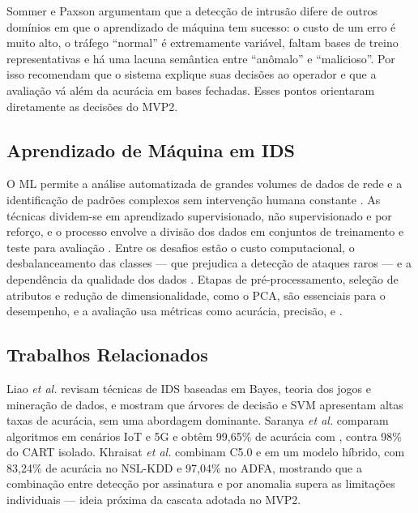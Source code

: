 Sommer e Paxson \cite{Sommer2010Outside} argumentam que a detecção de intrusão
difere de outros domínios em que o aprendizado de máquina tem sucesso: o custo de
um erro é muito alto, o tráfego “normal” é extremamente variável, faltam bases de
treino representativas e há uma lacuna semântica entre “anômalo” e “malicioso”.
Por isso recomendam que o sistema explique suas decisões ao operador e que a
avaliação vá além da acurácia em bases fechadas. Esses pontos orientaram
diretamente as decisões do MVP2.

\subsection{Aprendizado de Máquina em IDS}
O ML permite a análise automatizada de grandes volumes de dados de rede e a
identificação de padrões complexos sem intervenção humana constante
\cite{zehedi2023comparative, Thakkar2021Survey}. As técnicas dividem-se em
aprendizado supervisionado, não supervisionado e por reforço, e o processo envolve
a divisão dos dados em conjuntos de treinamento e teste para avaliação
\cite{zehedi2023comparative, emad2022intrusion}. Entre os desafios estão o custo
computacional, o desbalanceamento das classes --- que prejudica a detecção de
ataques raros --- e a dependência da qualidade dos dados \cite{zehedi2023comparative}.
Etapas de pré-processamento, seleção de atributos e redução de dimensionalidade,
como o PCA, são essenciais para o desempenho, e a avaliação usa métricas como
acurácia, precisão,  e  \cite{zehedi2023comparative, Thakkar2021Survey}.

\subsection{Trabalhos Relacionados}
Liao \textit{et al.} \cite{Liao2013Intrusion} revisam técnicas de IDS baseadas em
Bayes, teoria dos jogos e mineração de dados, e mostram que árvores de decisão e SVM
apresentam altas taxas de acurácia, sem uma abordagem dominante. Saranya
\textit{et al.} \cite{Saranya2020Performance} comparam algoritmos em cenários IoT e
5G e obtêm 99,65\% de acurácia com , contra 98\% do CART isolado.
Khraisat \textit{et al.} \cite{Khraisat2019Hybrid} combinam C5.0 e
 em um modelo híbrido, com 83,24\% de acurácia no NSL-KDD e
97,04\% no ADFA, mostrando que a combinação entre detecção por assinatura e por
anomalia supera as limitações individuais --- ideia próxima da cascata adotada no
MVP2.

